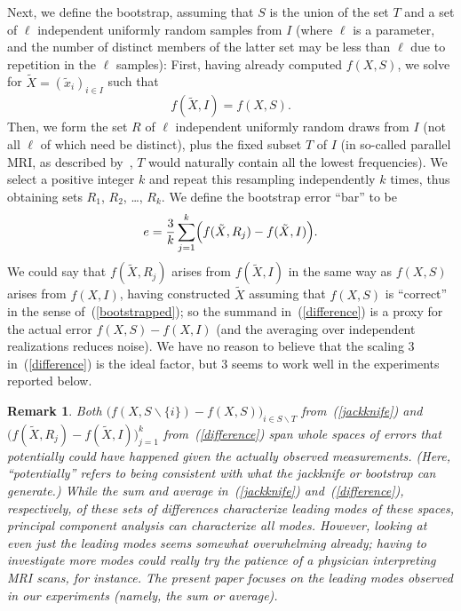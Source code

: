 \documentclass[article]{jdssv}
\newtheorem{remark1}[theorem]{Remark}
\newenvironment{remark}{\begin{remark1} \rm}{\end{remark1}}
\begin{document}
Next, we define the bootstrap, assuming that $S$ is the union of the set $T$
and a set of $\ell$ independent uniformly random samples from $I$
(where $\ell$ is a parameter, and the number of distinct members
of the latter set may be less than $\ell$ due to repetition
in the $\ell$ samples):
First, having already computed $f(X, S)$,
we solve for $\tilde{X} = (\tilde{x}_i)_{i \in I}$ such that
%
\begin{equation}
\label{bootstrapped}
f(\tilde{X}, I) = f(X, S).
\end{equation}
%
Then, we form the set $R$ of $\ell$ independent uniformly random draws from $I$
(not all $\ell$ of which need be distinct),
plus the fixed subset $T$ of $I$ (in so-called parallel MRI,
as described by~\citet{brown-cheng-haacke-thompson-venkatesan},
$T$ would naturally contain all the lowest frequencies).
We select a positive integer $k$ and repeat this resampling independently
$k$ times, thus obtaining sets $R_1$, $R_2$, \dots, $R_k$.
We define the bootstrap error ``bar'' to be
%
\begin{equation}
\label{difference}
e = \frac{3}{k} \sum_{j = 1}^k
    \Bigl( f(\tilde{X}, R_j) - f(\tilde{X}, I) \Bigr).
\end{equation}
%
We could say that $f(\tilde{X}, R_j)$ arises from $f(\tilde{X}, I)$
in the same way as $f(X, S)$ arises from $f(X, I)$,
having constructed $\tilde{X}$ assuming that $f(X, S)$ is ``correct''
in the sense of~(\ref{bootstrapped}); so the summand in~(\ref{difference})
is a proxy for the actual error $f(X, S) - f(X, I)$
(and the averaging over independent realizations reduces noise).
We have no reason to believe that the scaling $3$ in~(\ref{difference})
is the ideal factor, but $3$ seems to work well in the experiments
reported below.

\begin{remark}
Both $\bigl( f(X, S \backslash \{i\}) - f(X, S) \bigr)_{i \in S \backslash T}$
from~(\ref{jackknife})
and $\bigl( f(\tilde{X}, R_j) - f(\tilde{X}, I) \bigr)_{j = 1}^k$
from~(\ref{difference})
span whole spaces of errors that potentially could have happened
given the actually observed measurements.
(Here, ``potentially'' refers to being consistent
with what the jackknife or bootstrap can generate.)
While the sum and average in~(\ref{jackknife}) and~(\ref{difference}),
respectively, of these sets of differences characterize leading modes
of these spaces, principal component analysis can characterize all modes.
However, looking at even just the leading modes seems somewhat overwhelming
already; having to investigate more modes could really try the patience
of a physician interpreting MRI scans, for instance.
The present paper focuses on the leading modes observed in our experiments
(namely, the sum or average).
\end{remark}
\end{document}
